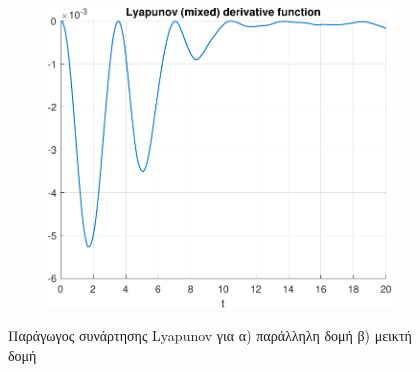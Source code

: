\documentclass[a4paper,12pt]{article}
\begin{document}
\begin{figure}[h!]
\begin{subfigure}{0.45\textwidth}
        \includegraphics[width=\linewidth]{plot/task1_lyapunov_derivative_function_mixed.pdf}
        \caption{}
        \label{fig:task1_lyapunov_derivative_function_mixed}
    \end{subfigure}
    \caption{Παράγωγος συνάρτησης Lyapunov για 
    α) παράλληλη δομή β) μεικτή δομή}
    \label{fig:task1_lyapunov_derivative_function}
\end{figure}
\end{document}
